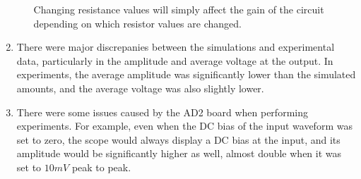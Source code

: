 \documentclass[12pt]{article}
\begin{document}
\begin{enumerate}
\begin{enumerate}
        Changing resistance values will simply affect the gain of the circuit depending on which resistor values are changed.  
    \end{enumerate}
    \item There were major discrepanies between the simulations and experimental data, particularly in the amplitude and average voltage at the output. In experiments, the average amplitude was significantly lower than the simulated amounts, and the average voltage was also slightly lower. 
    \item There were some issues caused by the AD2 board when performing experiments. For example, even when the DC bias of the input waveform was set to zero, the scope would always display a DC bias at the input, and its amplitude would be significantly higher as well, almost double when it was set to $10 mV$ peak to peak.
\end{enumerate}
\end{document}

